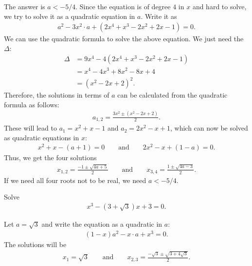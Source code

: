 \documentclass[12pt,a4paper]{memoir}
\theoremstyle{definition}
\begin{document}
\begin{solution}[name=Solution by Parviz Shahriari]
	The answer is $a<-5/4$. Since the equation is of degree $4$ in $x$ and hard to solve, we try to solve it as a quadratic equation in $a$. Write it as
	\begin{align*}
		a^2 - 3x^2 \cdot a + (2x^4 +x^3-2x^2+2x-1)=0.
	\end{align*}
	We can use the quadratic formula to solve the above equation. We just need the $\Delta$:
	\begin{align*}
		\Delta &= 9x^4 -4(2x^4 +x^3-2x^2+2x-1) \\
		&= x^4 - 4x^3 + 8x^2 - 8x + 4\\
		&= (x^2-2x+2)^2.
	\end{align*}
	Therefore, the solutions in terms of $a$ can be calculated from the quadratic formula as follows:
	\begin{align*}
		a_{1,2} = \frac{3x^2 \pm (x^2 - 2x + 2)}{2}.
	\end{align*}
	These will lead to $a_1=x^2+x-1$ and $a_2=2x^2-x+1$, which can now be solved as quadratic equations in $x$:
	\begin{align*}
		x^2 + x - (a+1) = 0 \qquad \text{and} \qquad 2x^2 - x + (1-a)=0.
	\end{align*}
	Thus, we get the four solutions
	\begin{align*}
		x_{1,2} = \frac{-1 \pm \sqrt{4a+5}}{2} \qquad \text{and} \qquad x_{3,4} = \frac{1 \pm \sqrt{4a-3}}{2}.
	\end{align*}
	If we need all four roots not to be real, we need $a<-5/4$.
\end{solution}




\begin{tcolorbox}
	\begin{question}
		Solve
		\begin{align*}
			x^3 - (3+\sqrt{3})x + 3 = 0.
		\end{align*}
	\end{question}
\end{tcolorbox}

\begin{solution}[name=Solution by Parviz Shahriari]
	Let $a= \sqrt 3$ and write the equation as a quadratic in $a$:
	\begin{align*}
		(1-x)a^2 - x \cdot a + x^3 =0.
	\end{align*}
	The solutions will be
	\begin{align*}
		x_1 = \sqrt{3} \qquad \text{and} \qquad x_{2,3} = \frac{-\sqrt{3}\pm \sqrt{3+4\sqrt{3}}}{2}.
	\end{align*}
\end{solution}
\end{document}
